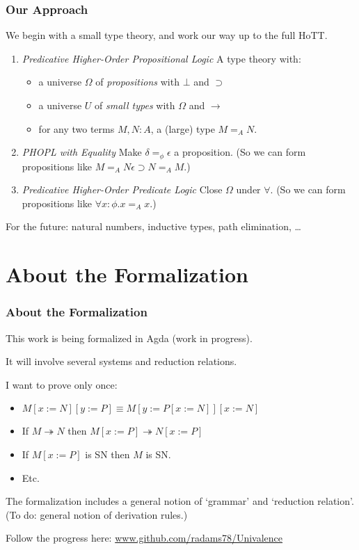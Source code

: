 \begin{frame}
\frametitle{Our Approach}
We begin with a small type theory, and work our way up to the full HoTT. %
\begin{enumerate}
\item \emph{Predicative Higher-Order Propositional Logic} A type theory with:
  \begin{itemize}
  \item a universe $\Omega$ of \emph{propositions} with $\bot$ and $\supset$
  \item a universe $U$ of \emph{small types} with $\Omega$ and $\rightarrow$
  \item for any two terms $M, N : A$, a (large) type $M =_A N$.
  \end{itemize}
\item \emph{PHOPL with Equality}
Make $\delta =_\phi \epsilon$ a proposition.  (So we can form propositions like $M =_A N \epsilon \supset N =_A M$.)
\item \emph{Predicative Higher-Order Predicate Logic} Close $\Omega$ under $\forall$.  (So we can form propositions like $\forall x : \phi. x =_A x$.)
\end{enumerate}
For the future: natural numbers, inductive types, path elimination, \ldots
\end{frame}

\section{About the Formalization}

\begin{frame}
\frametitle{About the Formalization}
This work is being formalized in Agda (work in progress).

It will involve several systems and reduction relations.

I want to prove only once:
\begin{itemize}
\item
$M[x:=N][y:=P] \equiv M[y:=P[x:=N]][x:=N]$
\item
If $M \twoheadrightarrow N$ then $M[x:=P] \twoheadrightarrow N[x:=P]$
\item
If $M[x:=P]$ is SN then $M$ is SN.
\item
Etc.
\end{itemize}
The formalization includes a general notion of `grammar' and `reduction relation'.  (To do: general notion of derivation rules.)

Follow the progress here: \url{www.github.com/radams78/Univalence}
\end{frame}

